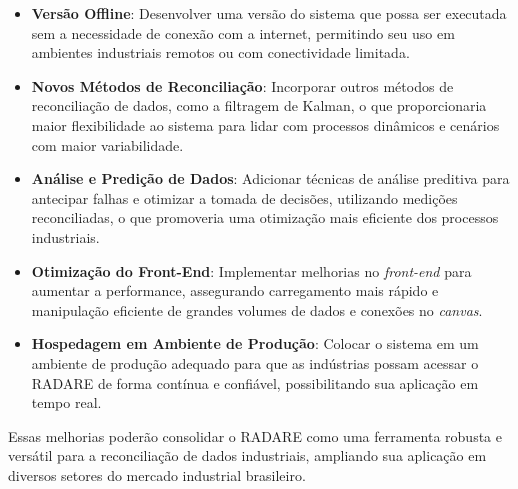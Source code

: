 \begin{itemize}
    \item \textbf{Versão Offline}: Desenvolver uma versão do sistema que possa ser executada sem a necessidade de conexão com a internet, permitindo seu uso em ambientes industriais remotos ou com conectividade limitada.
    
    \item \textbf{Novos Métodos de Reconciliação}: Incorporar outros métodos de reconciliação de dados, como a filtragem de Kalman, o que proporcionaria maior flexibilidade ao sistema para lidar com processos dinâmicos e cenários com maior variabilidade.
    
    \item \textbf{Análise e Predição de Dados}: Adicionar técnicas de análise preditiva para antecipar falhas e otimizar a tomada de decisões, utilizando medições reconciliadas, o que promoveria uma otimização mais eficiente dos processos industriais.
    
    \item \textbf{Otimização do Front-End}: Implementar melhorias no \textit{front-end} para aumentar a performance, assegurando carregamento mais rápido e manipulação eficiente de grandes volumes de dados e conexões no \textit{canvas}.
    
    \item \textbf{Hospedagem em Ambiente de Produção}: Colocar o sistema em um ambiente de produção adequado para que as indústrias possam acessar o RADARE de forma contínua e confiável, possibilitando sua aplicação em tempo real.
\end{itemize}

Essas melhorias poderão consolidar o RADARE como uma ferramenta robusta e versátil para a reconciliação de dados industriais, ampliando sua aplicação em diversos setores do mercado industrial brasileiro.
